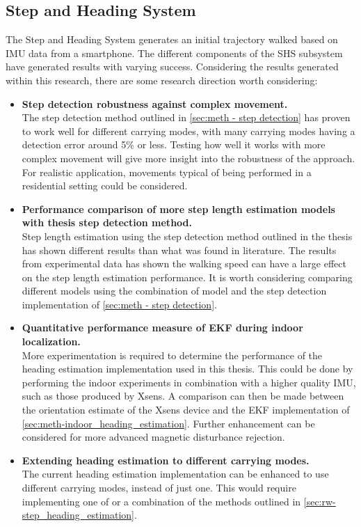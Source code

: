 \subsection{Step and Heading System }

The Step and Heading System generates an initial trajectory walked based on IMU data from a smartphone. The different components of the \ac{SHS} subsystem have generated results with varying success. Considering the results generated within this research, there are some research direction worth considering:

\begin{itemize}
	\item \textbf{Step detection robustness against complex movement.} \\
	The step detection method outlined in \cref{sec:meth - step detection} has proven to work well for different carrying modes, with many carrying modes having a detection error around 5\% or less. Testing how well it works with more complex movement will give more insight into the robustness of the approach. For realistic application, movements typical of being performed in a residential setting could be considered.
	
	\item \textbf{Performance comparison of more step length estimation models with thesis step detection method.} \\
	Step length estimation using the step detection method outlined in the thesis has shown different results than what was found in literature. The results from experimental data has shown the walking speed can have a large effect on the step length estimation performance. It is worth considering comparing different models using the combination of model and the step detection implementation of \cref{sec:meth - step detection}. 
	
	\item \textbf{Quantitative performance measure of EKF during indoor localization.}\\
	More experimentation is required to determine the performance of the heading estimation implementation used in this thesis. This could be done by performing the indoor experiments in combination with a higher quality \ac{IMU}, such as those produced by Xsens. A comparison can then be made between the orientation estimate of the Xsens device and the EKF implementation of \cref{sec:meth-indoor_heading_estimation}. Further enhancement can be considered for more advanced magnetic disturbance rejection.
	
	\item \textbf{Extending heading estimation to different carrying modes.}\\
	The current heading estimation implementation can be enhanced to use different carrying modes, instead of just one. This would require implementing one of or a combination of the methods outlined in \cref{sec:rw-step_heading_estimation}.
	
\end{itemize}

